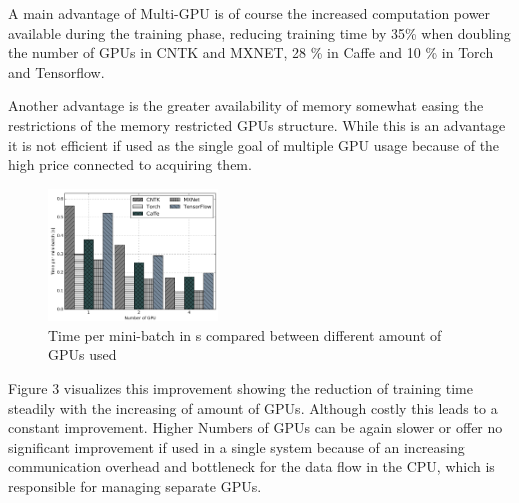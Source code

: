 \documentclass[conference]{IEEEtran}
\begin{document}
A main advantage of Multi-GPU is of course the increased computation power available during the training phase, reducing training time by 35\% when doubling the number of GPUs in CNTK and MXNET, 28 \% in Caffe and 10 \% in  Torch and Tensorflow\cite{shi2016benchmarking}.

Another advantage is the greater availability of memory somewhat easing the restrictions of the memory restricted GPUs structure. While this is an advantage it is not efficient if used as the single goal of multiple GPU usage because of the high price connected to acquiring them.

\begin{figure}
\centering
\includegraphics[width=0.4\textwidth]{a.png}

\caption{Time per mini-batch in s compared between different amount of GPUs used\cite{shi2016benchmarking}}
\label{fig_m_gpu}
\end{figure}

Figure 3 visualizes this improvement showing the reduction of training time steadily with the increasing of amount of GPUs. Although costly this leads to a constant improvement. Higher Numbers of GPUs can be again slower or offer no significant improvement if used in a single system because of an increasing communication overhead and bottleneck for the data flow in the CPU, which is responsible for managing separate GPUs.
\end{document}
